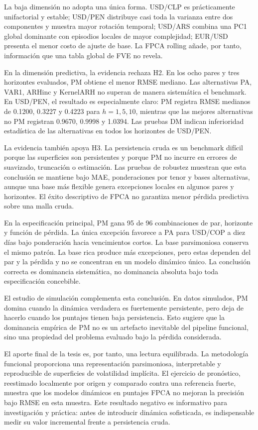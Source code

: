 \documentclass[a4paper,11pt]{article}
\begin{document}
La baja dimensión no adopta una única forma. USD/CLP es prácticamente unifactorial y estable; USD/PEN distribuye casi toda la varianza entre dos componentes y muestra mayor rotación temporal; USD/ARS combina una PC1 global dominante con episodios locales de mayor complejidad; EUR/USD presenta el menor costo de ajuste de base. La FPCA rolling añade, por tanto, información que una tabla global de FVE no revela.

En la dimensión predictiva, la evidencia rechaza H2. En los ocho pares y tres horizontes evaluados, PM obtiene el menor RMSE mediano. Las alternativas PA, VAR1, ARHinc y KernelARH no superan de manera sistemática el benchmark. En USD/PEN, el resultado es especialmente claro: PM registra RMSE medianos de 0.1200, 0.3227 y 0.4223 para \(h=1,5,10\), mientras que las mejores alternativas no PM registran 0.9670, 0.9998 y 1.0394. Las pruebas DM indican inferioridad estadística de las alternativas en todos los horizontes de USD/PEN.

La evidencia también apoya H3. La persistencia cruda es un benchmark difícil porque las superficies son persistentes y porque PM no incurre en errores de suavizado, truncación o estimación. Las pruebas de robustez muestran que esta conclusión se mantiene bajo MAE, ponderaciones por tenor y bases alternativas, aunque una base más flexible genera excepciones locales en algunos pares y horizontes. El éxito descriptivo de FPCA no garantiza menor pérdida predictiva sobre una malla cruda.

En la especificación principal, PM gana 95 de 96 combinaciones de par, horizonte y función de pérdida. La única excepción favorece a PA para USD/COP a diez días bajo ponderación hacia vencimientos cortos. La base parsimoniosa conserva el mismo patrón. La base rica produce más excepciones, pero estas dependen del par y la pérdida y no se concentran en un modelo dinámico único. La conclusión correcta es dominancia sistemática, no dominancia absoluta bajo toda especificación concebible.

El estudio de simulación complementa esta conclusión. En datos simulados, PM domina cuando la dinámica verdadera es fuertemente persistente, pero deja de hacerlo cuando los puntajes tienen baja persistencia. Esto sugiere que la dominancia empírica de PM no es un artefacto inevitable del pipeline funcional, sino una propiedad del problema evaluado bajo la pérdida considerada.

El aporte final de la tesis es, por tanto, una lectura equilibrada. La metodología funcional proporciona una representación parsimoniosa, interpretable y reproducible de superficies de volatilidad implícita. El ejercicio de pronóstico, reestimado localmente por origen y comparado contra una referencia fuerte, muestra que los modelos dinámicos en puntajes FPCA no mejoran la precisión bajo RMSE en esta muestra. Este resultado negativo es informativo para investigación y práctica: antes de introducir dinámica sofisticada, es indispensable medir su valor incremental frente a persistencia cruda.
\end{document}
